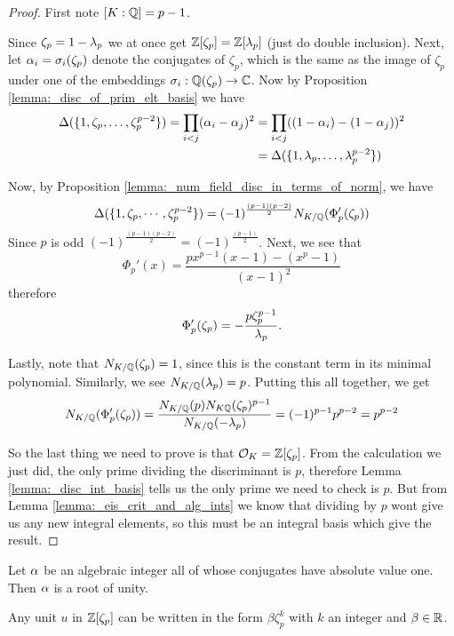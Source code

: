 \begin{proof}
	First note $[K:\mathbb{Q}]=p-1$.
	
	Since $\zeta_p=1-\lambda_p$ we at once get $\mathbb{Z}[\zeta_p]=\mathbb{Z}[\lambda_p]$ (just do double inclusion). Next, let $\alpha_i=\sigma_i(\zeta_p)$ denote the conjugates of $\zeta_p$, which is the same as the image of $\zeta_p$ under one of the embeddings $\sigma_i: \mathbb{Q}(\zeta_p) \to \mathbb{C}$. Now  by Proposition \ref{lemma:_disc_of_prim_elt_basis} we have \begin{align*}\Delta(\{1,\zeta_p,\dots,\zeta_p^{p-2}\})=\prod_{i < j}  (\alpha_i-\alpha_j)^2 &=\prod_{i < j}  ((1-\alpha_i)-(1-\alpha_j))^2\\&=\Delta(\{1,\lambda_p,\dots,\lambda_p^{p-2}\})\end{align*}
	
	Now, by Proposition \ref{lemma:_num_field_disc_in_terms_of_norm}, we have \[\Delta(\{1,\zeta_p,\cdots,\zeta_p^{p-2}\})=(-1)^{\frac{(p-1)(p-2)}{2}}N_{K/\mathbb{Q}}(\Phi_p'(\zeta_p)  )\]
	Since $p$ is odd $(-1)^{\frac{(p-1)(p-2)}{2}}=(-1)^{\frac{(p-1)}{2}}$. Next, we see that \[\Phi_p'(x)=\frac{px^{p-1}(x-1)-(x^p-1)}{(x-1)^2}\] therefore \[\Phi_p'(\zeta_p)=-\frac{p\zeta_p^{p-1}}{\lambda_p}.\]
	
	Lastly, note that $N_{K/\mathbb{Q}}(\zeta_p)=1$, since this is the constant term in its minimal polynomial. Similarly, we see $N_{K/\mathbb{Q}}(\lambda_p)=p$. Putting this all together, we get \[N_{K/\mathbb{Q}}(\Phi_p'(\zeta_p)  )=\frac{N_{K/\mathbb{Q}}(p)N_{K\mathbb{Q}}(\zeta_p)^{p-1}}{N_{K/\mathbb{Q}}(-\lambda_p)}=(-1)^{p-1}p^{p-2}=p^{p-2}\]
	
	So the last thing we need to prove is that $\mathcal{O}_K=\mathbb{Z}[\zeta_p]$. From the calculation we just did, the only prime dividing the discriminant is $p$, therefore Lemma \ref{lemma:_disc_int_basis} tells us the only prime we need to check is $p$. But from Lemma \ref{lemma:_eis_crit_and_alg_ints} we know that dividing by $p$ wont give us any new integral elements, so this must be an integral basis which give the result.
\end{proof}

\begin{lemma}\label{lemma:_alg_int_abs_val_one}
	Let $\alpha$ be an algebraic integer all of whose conjugates have absolute value one. Then $\alpha$ is a root of unity.
\end{lemma}


\begin{lemma}\label{lemma:_unit_lemma}
	Any unit $u$ in $\mathbb{Z}[\zeta_p]$ can be written in the form $\beta \zeta_p^k  $ with $k$ an integer and $\beta \in \mathbb{R}$.
\end{lemma}	

